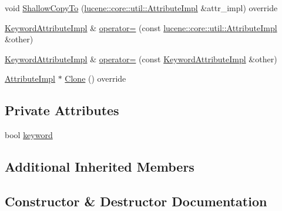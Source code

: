 \begin{DoxyCompactItemize}
void \mbox{\hyperlink{classlucene_1_1core_1_1analysis_1_1tokenattributes_1_1KeywordAttributeImpl_a83f442881b35bc26a6edb2e04beeb58a}{Shallow\+Copy\+To}} (\mbox{\hyperlink{classlucene_1_1core_1_1util_1_1AttributeImpl}{lucene\+::core\+::util\+::\+Attribute\+Impl}} \&attr\+\_\+impl) override
\item 
\mbox{\hyperlink{classlucene_1_1core_1_1analysis_1_1tokenattributes_1_1KeywordAttributeImpl}{Keyword\+Attribute\+Impl}} \& \mbox{\hyperlink{classlucene_1_1core_1_1analysis_1_1tokenattributes_1_1KeywordAttributeImpl_a30228ce41cc678c1cb85c2fb1179f447}{operator=}} (const \mbox{\hyperlink{classlucene_1_1core_1_1util_1_1AttributeImpl}{lucene\+::core\+::util\+::\+Attribute\+Impl}} \&other)
\item 
\mbox{\hyperlink{classlucene_1_1core_1_1analysis_1_1tokenattributes_1_1KeywordAttributeImpl}{Keyword\+Attribute\+Impl}} \& \mbox{\hyperlink{classlucene_1_1core_1_1analysis_1_1tokenattributes_1_1KeywordAttributeImpl_a26caf7be7512728452c2a5496788c39c}{operator=}} (const \mbox{\hyperlink{classlucene_1_1core_1_1analysis_1_1tokenattributes_1_1KeywordAttributeImpl}{Keyword\+Attribute\+Impl}} \&other)
\item 
\mbox{\hyperlink{classlucene_1_1core_1_1util_1_1AttributeImpl}{Attribute\+Impl}} $\ast$ \mbox{\hyperlink{classlucene_1_1core_1_1analysis_1_1tokenattributes_1_1KeywordAttributeImpl_a59d16bdfa3c456ebcd8b3ae90279cd7b}{Clone}} () override
\end{DoxyCompactItemize}
\subsection*{Private Attributes}
\begin{DoxyCompactItemize}
\item 
bool \mbox{\hyperlink{classlucene_1_1core_1_1analysis_1_1tokenattributes_1_1KeywordAttributeImpl_a126e0c7f8c8c863cc2600f89ebade88d}{keyword}}
\end{DoxyCompactItemize}
\subsection*{Additional Inherited Members}


\subsection{Constructor \& Destructor Documentation}
\mbox{\label{classlucene_1_1core_1_1analysis_1_1tokenattributes_1_1KeywordAttributeImpl_a1a92ef5f629fcca79c12a5009deb7941}} 
